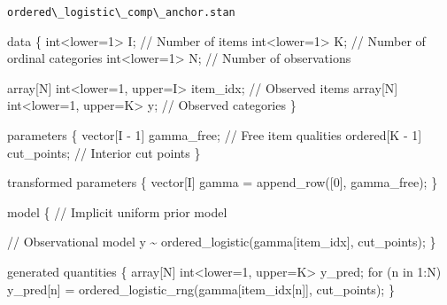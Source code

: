 \documentclass[
  letterpaper,
  DIV=11,
  numbers=noendperiod]{scrartcl}
\newenvironment{Shaded}{\begin{snugshade}}{\end{snugshade}}
\newcommand{\CommentTok}[1]{\textcolor[rgb]{0.37,0.37,0.37}{#1}}
\newcommand{\ControlFlowTok}[1]{\textcolor[rgb]{0.00,0.23,0.31}{#1}}
\newcommand{\DataTypeTok}[1]{\textcolor[rgb]{0.68,0.00,0.00}{#1}}
\newcommand{\DecValTok}[1]{\textcolor[rgb]{0.68,0.00,0.00}{#1}}
\newcommand{\KeywordTok}[1]{\textcolor[rgb]{0.00,0.23,0.31}{#1}}
\newcommand{\NormalTok}[1]{\textcolor[rgb]{0.00,0.23,0.31}{#1}}
\begin{document}
\begin{codelisting}

\caption{\texttt{ordered\textbackslash\_logistic\textbackslash\_comp\textbackslash\_anchor.stan}}

\begin{Shaded}
\begin{Highlighting}[]
\KeywordTok{data}\NormalTok{ \{}
  \DataTypeTok{int}\NormalTok{\textless{}}\KeywordTok{lower}\NormalTok{=}\DecValTok{1}\NormalTok{\textgreater{} I;                   }\CommentTok{// Number of items}
  \DataTypeTok{int}\NormalTok{\textless{}}\KeywordTok{lower}\NormalTok{=}\DecValTok{1}\NormalTok{\textgreater{} K;                   }\CommentTok{// Number of ordinal categories}
  \DataTypeTok{int}\NormalTok{\textless{}}\KeywordTok{lower}\NormalTok{=}\DecValTok{1}\NormalTok{\textgreater{} N;                   }\CommentTok{// Number of observations}

  \DataTypeTok{array}\NormalTok{[N] }\DataTypeTok{int}\NormalTok{\textless{}}\KeywordTok{lower}\NormalTok{=}\DecValTok{1}\NormalTok{, }\KeywordTok{upper}\NormalTok{=I\textgreater{} item\_idx; }\CommentTok{// Observed items}
  \DataTypeTok{array}\NormalTok{[N] }\DataTypeTok{int}\NormalTok{\textless{}}\KeywordTok{lower}\NormalTok{=}\DecValTok{1}\NormalTok{, }\KeywordTok{upper}\NormalTok{=K\textgreater{} y;        }\CommentTok{// Observed categories}
\NormalTok{\}}

\KeywordTok{parameters}\NormalTok{ \{}
  \DataTypeTok{vector}\NormalTok{[I {-} }\DecValTok{1}\NormalTok{] gamma\_free;  }\CommentTok{// Free item qualities}
  \DataTypeTok{ordered}\NormalTok{[K {-} }\DecValTok{1}\NormalTok{] cut\_points; }\CommentTok{// Interior cut points}
\NormalTok{\}}

\KeywordTok{transformed parameters}\NormalTok{ \{}
  \DataTypeTok{vector}\NormalTok{[I] gamma = append\_row([}\DecValTok{0}\NormalTok{]\textquotesingle{}, gamma\_free);}
\NormalTok{\}}

\KeywordTok{model}\NormalTok{ \{}
  \CommentTok{// Implicit uniform prior model}
  
  \CommentTok{// Observational model}
\NormalTok{  y \textasciitilde{} ordered\_logistic(gamma[item\_idx], cut\_points);}
\NormalTok{\}}

\KeywordTok{generated quantities}\NormalTok{ \{}
  \DataTypeTok{array}\NormalTok{[N] }\DataTypeTok{int}\NormalTok{\textless{}}\KeywordTok{lower}\NormalTok{=}\DecValTok{1}\NormalTok{, }\KeywordTok{upper}\NormalTok{=K\textgreater{} y\_pred;}
  \ControlFlowTok{for}\NormalTok{ (n }\ControlFlowTok{in} \DecValTok{1}\NormalTok{:N)}
\NormalTok{    y\_pred[n] = ordered\_logistic\_rng(gamma[item\_idx[n]], cut\_points);}
\NormalTok{\}}
\end{Highlighting}
\end{Shaded}

\end{codelisting}
\end{document}
